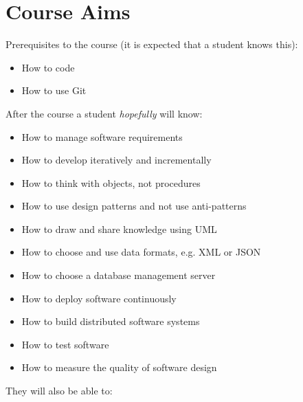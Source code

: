 \documentclass[nobrand,anonymous,nodate,nosecurity]{huawei}
\begin{document}

\newpage
\section*{Course Aims}

Prerequisites to the course (it is expected that a student knows this):

\begin{itemize}
\item How to code
\item How to use Git
\end{itemize}

After the course a student \emph{hopefully} will know:

\begin{itemize}
\item How to manage software requirements
\item How to develop iteratively and incrementally
\item How to think with objects, not procedures
\item How to use design patterns and not use anti-patterns
\item How to draw and share knowledge using UML
\item How to choose and use data formats, e.g. XML or JSON
\item How to choose a database management server
\item How to deploy software continuously
\item How to build distributed software systems
\item How to test software
\item How to measure the quality of software design
\end{itemize}

They will also be able to:
\end{document}
